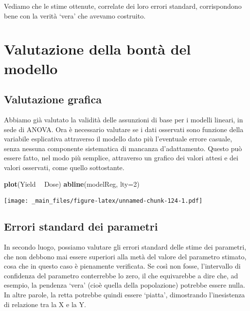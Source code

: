 \documentclass[a4paper,12pt,oneside]{book}
\newenvironment{Shaded}{\begin{snugshade}}{\end{snugshade}}
\newcommand{\KeywordTok}[1]{\textcolor[rgb]{0.13,0.29,0.53}{\textbf{#1}}}
\newcommand{\DataTypeTok}[1]{\textcolor[rgb]{0.13,0.29,0.53}{#1}}
\newcommand{\DecValTok}[1]{\textcolor[rgb]{0.00,0.00,0.81}{#1}}
\newcommand{\StringTok}[1]{\textcolor[rgb]{0.31,0.60,0.02}{#1}}
\newcommand{\OperatorTok}[1]{\textcolor[rgb]{0.81,0.36,0.00}{\textbf{#1}}}
\newcommand{\NormalTok}[1]{#1}
\theoremstyle{definition}
\theoremstyle{definition}
\theoremstyle{definition}
\theoremstyle{remark}
\begin{document}
Vediamo che le stime ottenute, correlate dei loro errori standard,
corrispondono bene con la verità `vera' che avevamo costruito.

\section{Valutazione della bontà del
modello}\label{valutazione-della-bonta-del-modello}

\subsection{Valutazione grafica}\label{valutazione-grafica}

Abbiamo già valutato la validità delle assunzioni di base per i modelli
lineari, in sede di ANOVA. Ora è necessario valutare se i dati osservati
sono funzione della variabile esplicativa attraverso il modello dato più
l'eventuale errore casuale, senza nessuna componente sistematica di
mancanza d'adattamento. Questo può essere fatto, nel modo più semplice,
attraverso un grafico dei valori attesi e dei valori osservati, come
quello sottostante.

\begin{Shaded}
\begin{Highlighting}[]
\KeywordTok{plot}\NormalTok{(Yield }\OperatorTok{~}\StringTok{ }\NormalTok{Dose)}
\KeywordTok{abline}\NormalTok{(modelReg, }\DataTypeTok{lty=}\DecValTok{2}\NormalTok{)}
\end{Highlighting}
\end{Shaded}

\texttt{[image: \_main\_files/figure-latex/unnamed-chunk-124-1.pdf]}

\subsection{Errori standard dei
parametri}\label{errori-standard-dei-parametri}

In secondo luogo, possiamo valutare gli errori standard delle stime dei
parametri, che non debbono mai essere superiori alla metà del valore del
parametro stimato, cosa che in questo caso è pienamente verificata. Se
così non fosse, l'intervallo di confidenza del parametro conterrebbe lo
zero, il che equivarebbe a dire che, ad esempio, la pendenza `vera'
(cioè quella della popolazione) potrebbe essere nulla. In altre parole,
la retta potrebbe quindi essere `piatta', dimostrando l'inesistenza di
relazione tra la X e la Y.
\end{document}
